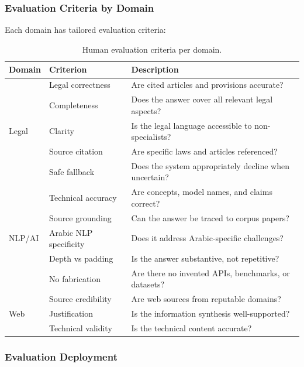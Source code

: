 \documentclass[12pt, a4paper]{article}
\begin{document}
\subsubsection{Evaluation Criteria by Domain}

Each domain has tailored evaluation criteria:

\begin{table}[H]
\centering
\caption{Human evaluation criteria per domain.}
\small
\begin{tabularx}{\textwidth}{l l X}
\toprule
\rowcolor{tablehead}\color{white}\textbf{Domain} & \color{white}\textbf{Criterion} & \color{white}\textbf{Description} \\
\midrule
\multirow{5}{*}{Legal} & Legal correctness & Are cited articles and provisions accurate? \\
& Completeness & Does the answer cover all relevant legal aspects? \\
& Clarity & Is the legal language accessible to non-specialists? \\
& Source citation & Are specific laws and articles referenced? \\
& Safe fallback & Does the system appropriately decline when uncertain? \\
\midrule
\multirow{5}{*}{NLP/AI} & Technical accuracy & Are concepts, model names, and claims correct? \\
& Source grounding & Can the answer be traced to corpus papers? \\
& Arabic NLP specificity & Does it address Arabic-specific challenges? \\
& Depth vs padding & Is the answer substantive, not repetitive? \\
& No fabrication & Are there no invented APIs, benchmarks, or datasets? \\
\midrule
\multirow{3}{*}{Web} & Source credibility & Are web sources from reputable domains? \\
& Justification & Is the information synthesis well-supported? \\
& Technical validity & Is the technical content accurate? \\
\bottomrule
\end{tabularx}
\end{table}

\subsubsection{Evaluation Deployment}
\end{document}
